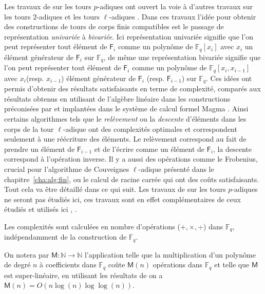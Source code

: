 \documentclass[10pt,a4paper]{book}
\theoremstyle{plain}
\theoremstyle{definition}
\theoremstyle{definition}
\theoremstyle{definition}
\theoremstyle{definition}
\theoremstyle{definition}
\theoremstyle{remark}
\theoremstyle{remark}
\theoremstyle{definition}
\begin{document}
Les travaux de \cite{DeFeo-Shost'12} sur les tours $p$-adiques ont ouvert la voie à d'autres travaux sur les tours $2$-adiques \cite{Doliskani-Schost15} et les tours $\ell$-adiques \cite{DeFeo-Doliskani-Schost13}. Dans ces travaux l'idée pour obtenir des constructions de tours de corps finis compatibles est le passage de représentation \textit{univariée} à \textit{bivariée}. Ici représentation univariée signifie que l'on peut représenter tout élément de $\mathsf{F}_i$ comme un polynôme de $\mathbb{F}_q[x_i]$ avec $x_i$ un élément générateur de $\mathsf{F}_i$ sur $\mathbb{F}_q$, de même une représentation bivariée signifie que l'on peut représenter tout élément de $\mathsf{F}_i$ comme un polynôme de $\mathbb{F}_q[x_i, x_{i-1}]$ avec $x_i$(resp. $x_{i-1}$) élément générateur de $\mathsf{F}_i$ (resp. $\mathsf{F}_{i-1}$) sur $\mathbb{F}_q$. Ces idées ont permis d'obtenir des résultats satisfaisants en terme de complexité, comparés aux résultats obtenus en utilisant de l'algèbre linéaire dans les constructions préconisées par \cite{BosmaCS97} et implantées dans le système de calcul formel Magma \cite{magma97}. Ainsi certains algorithmes tels que le \textit{relèvement} ou la \textit{descente} d'éléments dans les corps de la tour $\ell$-adique ont des complexités optimales et correspondent seulement à une réécriture des éléments. Le relèvement correspond au fait de prendre un élément de $\mathsf{F}_{i-1}$ et de l'écrire comme un élément de $\mathsf{F}_i$, la descente correspond à l'opération inverse. Il y a aussi des opérations comme le Frobenius, crucial pour l'algorithme de Couveignes $\ell$-adique présenté dans le chapitre~\ref{cha:alg:fin}, ou le calcul de racine carrée qui ont des coûts satisfaisants. Tout cela va être détaillé dans ce qui suit. Les travaux de  \cite{DeFeo-Shost'12} sur les tours $p$-adiques ne seront pas étudiés ici, ces travaux sont en effet complémentaires de ceux étudiés et utilisés ici \cite{Doliskani-Schost15}, \cite{DeFeo-Doliskani-Schost13}.

Les complexités sont calculées en nombre d'opérations ($+, \times,\div$) dans $\mathbb{F}_q$, indépendamment de la construction de $\mathbb{F}_q$. 

On notera par $\mathsf{M}: \mathbb{N} \rightarrow \mathbb{N}$ l'application telle que la multiplication d'un polynôme de degré $n$ à coefficients dans $\mathbb{F}_q$ coûte $\mathsf{M}(n)$ opérations dans $\mathbb{F}_q$ et telle que $\mathsf{M}$ est super-linéaire, en utilisant les résultats de \cite{Cantor-Kaltofen91} on a $\mathsf{M}(n)=O(n\log(n) \log \log(n))$. 
\end{document}
